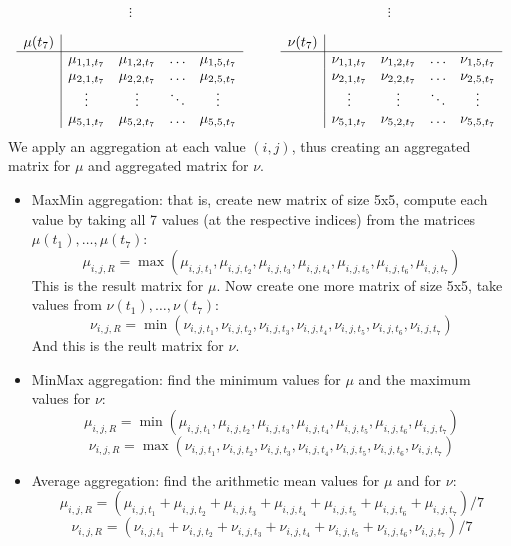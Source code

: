 \documentclass[12pt, a4paper]{article}
\begin{document}
\[ \begin{array}{ccc}
\vdots & \hspace{7cm} & \vdots \\
\end{array} \]
\[ \begin{array}{c|cccc cc c|cccc}
\mu(t_7) & & & & & & & \nu(t_7) & & & & \\
\cline{1-5} \cline{8-12}
& \mu_{1,1,t_7} & \mu_{1,2,t_7} & \ldots & \mu_{1,5,t_7} & \mbox{ } & \mbox{ } & & \nu_{1,1,t_7} & \nu_{1,2,t_7} & \ldots & \nu_{1,5,t_7} \\
& \mu_{2,1,t_7} & \mu_{2,2,t_7} & \ldots & \mu_{2,5,t_7} & \mbox{ } & \mbox{ } & & \nu_{2,1,t_7} & \nu_{2,2,t_7} & \ldots & \nu_{2,5,t_7} \\
& \vdots & \vdots & \ddots & \vdots & \mbox{ } & \mbox{ } & & \vdots & \vdots & \ddots & \vdots \\
& \mu_{5,1,t_7} & \mu_{5,2,t_7} & \ldots & \mu_{5,5,t_7} & \mbox{ } & \mbox{ } & & \nu_{5,1,t_7} & \nu_{5,2,t_7} & \ldots & \nu_{5,5,t_7}
\end{array} \]
We apply an aggregation at each value $(i,j)$, thus creating an aggregated matrix for $\mu$ and aggregated matrix for $\nu$.

\begin{itemize}
\item MaxMin aggregation: that is, create new matrix of size 5x5,
compute each value by taking all 7 values (at the respective indices) from the matrices $\mu(t_1),\ldots,\mu(t_7)$:
\[ \mu_{i,j,R} = \max(\mu_{i,j,t_1},\mu_{i,j,t_2},\mu_{i,j,t_3},\mu_{i,j,t_4},\mu_{i,j,t_5},\mu_{i,j,t_6},\mu_{i,j,t_7}) \]
This is the result matrix for $\mu$. Now create one more matrix of size 5x5, take values from $\nu(t_1),\ldots,\nu(t_7)$:
\[ \nu_{i,j,R} = \min(\nu_{i,j,t_1},\nu_{i,j,t_2},\nu_{i,j,t_3},\nu_{i,j,t_4},\nu_{i,j,t_5},\nu_{i,j,t_6},\nu_{i,j,t_7}) \]
And this is the reult matrix for $\nu$.

\item MinMax aggregation: find the minimum values for $\mu$ and the maximum values for $\nu$:
\[ \mu_{i,j,R} = \min(\mu_{i,j,t_1},\mu_{i,j,t_2},\mu_{i,j,t_3},\mu_{i,j,t_4},\mu_{i,j,t_5},\mu_{i,j,t_6},\mu_{i,j,t_7}) \]
\[ \nu_{i,j,R} = \max(\nu_{i,j,t_1},\nu_{i,j,t_2},\nu_{i,j,t_3},\nu_{i,j,t_4},\nu_{i,j,t_5},\nu_{i,j,t_6},\nu_{i,j,t_7}) \]

\item Average aggregation: find the arithmetic mean values for $\mu$ and for $\nu$:
\[ \mu_{i,j,R} = (\mu_{i,j,t_1} + \mu_{i,j,t_2} + \mu_{i,j,t_3} + \mu_{i,j,t_4} + \mu_{i,j,t_5} + \mu_{i,j,t_6} + \mu_{i,j,t_7})/7 \]
\[ \nu_{i,j,R} = (\nu_{i,j,t_1} + \nu_{i,j,t_2} + \nu_{i,j,t_3} + \nu_{i,j,t_4} + \nu_{i,j,t_5} + \nu_{i,j,t_6},\nu_{i,j,t_7})/7 \]
\end{itemize}
\end{document}
